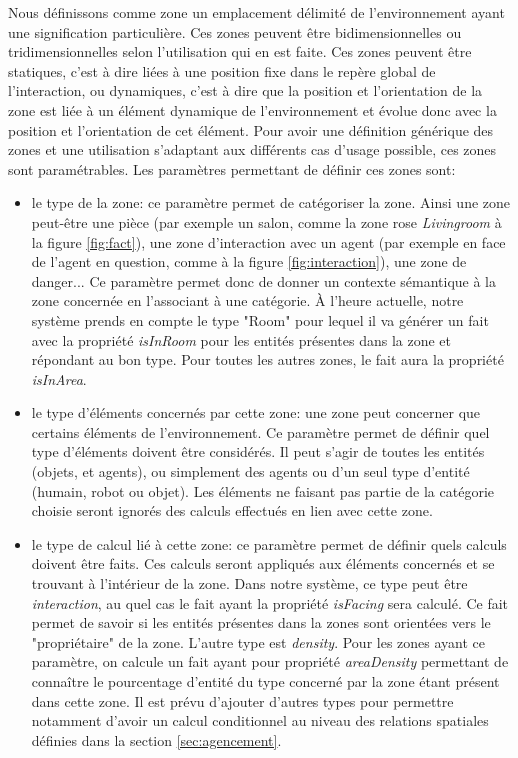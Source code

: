 \documentclass[a4paper,11pt,twoside]{StyleThese}
\begin{document}
Nous définissons comme zone un emplacement délimité de l'environnement ayant une signification particulière. Ces zones peuvent être bidimensionnelles ou tridimensionnelles selon l'utilisation qui en est faite. Ces zones peuvent être statiques, c'est à dire liées à une position fixe dans le repère global de l'interaction, ou dynamiques, c'est à dire que la position et l'orientation de la zone est liée à un élément dynamique de l'environnement et évolue donc avec la position et l'orientation de cet élément. Pour avoir une définition générique des zones et une utilisation s'adaptant aux différents cas d'usage possible, ces zones sont paramétrables. Les paramètres permettant de définir ces zones sont:
\begin{itemize}
\item le type de la zone: ce paramètre permet de catégoriser la zone. Ainsi une zone peut-être une pièce (par exemple un salon, comme la zone rose \textit{Livingroom} à la figure \ref{fig:fact}), une zone d'interaction avec un agent (par exemple en face de l'agent en question, comme à la figure \ref{fig:interaction}), une zone de danger...
Ce paramètre permet donc de donner un contexte sémantique à la zone concernée en l'associant à une catégorie. À l'heure actuelle, notre système prends en compte le type "Room" pour lequel il va générer un fait avec la propriété \textit{isInRoom} pour les entités présentes dans la zone et répondant au bon type. Pour toutes les autres zones, le fait aura la propriété \textit{isInArea}. 
\item le type d'éléments concernés par cette zone: une zone peut concerner que certains éléments de l'environnement. Ce paramètre permet de définir quel type d'éléments doivent être considérés. Il peut s'agir de toutes les entités (objets, et agents), ou simplement des agents ou d'un seul type d'entité (humain, robot ou objet). Les éléments ne faisant pas partie de la catégorie choisie seront ignorés des calculs effectués en lien avec cette zone.
\item le type de calcul lié à cette zone: ce paramètre permet de définir quels calculs doivent être faits. Ces calculs seront appliqués aux éléments concernés et se trouvant à l'intérieur de la zone. Dans notre système, ce type peut être \textit{interaction}, au quel cas le fait ayant la propriété \textit{isFacing} sera calculé. Ce fait permet de savoir si les entités présentes dans la zones sont orientées vers le "propriétaire" de la zone. L'autre type est \textit{density}. Pour les zones ayant ce paramètre, on calcule un fait ayant pour propriété \textit{areaDensity} permettant de connaître le pourcentage d'entité du type concerné par la zone étant présent dans cette zone. Il est prévu d'ajouter d'autres types pour permettre notamment d'avoir un calcul conditionnel au niveau des relations spatiales définies dans la section \ref{sec:agencement}. 

\end{itemize}
\end{document}
